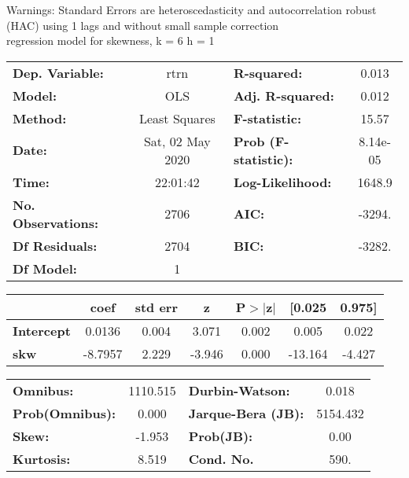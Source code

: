 Warnings: \newline
 [1] Standard Errors are heteroscedasticity and autocorrelation robust (HAC) using 1 lags and without small sample correction\\ 

regression model for skewness, k = 6 h = 1\begin{center}
\begin{tabular}{lclc}
\toprule
\textbf{Dep. Variable:}    &       rtrn       & \textbf{  R-squared:         } &     0.013   \\
\textbf{Model:}            &       OLS        & \textbf{  Adj. R-squared:    } &     0.012   \\
\textbf{Method:}           &  Least Squares   & \textbf{  F-statistic:       } &     15.57   \\
\textbf{Date:}             & Sat, 02 May 2020 & \textbf{  Prob (F-statistic):} &  8.14e-05   \\
\textbf{Time:}             &     22:01:42     & \textbf{  Log-Likelihood:    } &    1648.9   \\
\textbf{No. Observations:} &        2706      & \textbf{  AIC:               } &    -3294.   \\
\textbf{Df Residuals:}     &        2704      & \textbf{  BIC:               } &    -3282.   \\
\textbf{Df Model:}         &           1      & \textbf{                     } &             \\
\bottomrule
\end{tabular}
\begin{tabular}{lcccccc}
                   & \textbf{coef} & \textbf{std err} & \textbf{z} & \textbf{P$> |$z$|$} & \textbf{[0.025} & \textbf{0.975]}  \\
\midrule
\textbf{Intercept} &       0.0136  &        0.004     &     3.071  &         0.002        &        0.005    &        0.022     \\
\textbf{skw}       &      -8.7957  &        2.229     &    -3.946  &         0.000        &      -13.164    &       -4.427     \\
\bottomrule
\end{tabular}
\begin{tabular}{lclc}
\textbf{Omnibus:}       & 1110.515 & \textbf{  Durbin-Watson:     } &    0.018  \\
\textbf{Prob(Omnibus):} &   0.000  & \textbf{  Jarque-Bera (JB):  } & 5154.432  \\
\textbf{Skew:}          &  -1.953  & \textbf{  Prob(JB):          } &     0.00  \\
\textbf{Kurtosis:}      &   8.519  & \textbf{  Cond. No.          } &     590.  \\
\bottomrule
\end{tabular}
\end{center}

